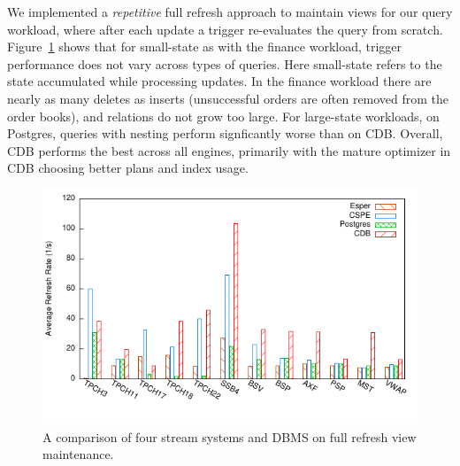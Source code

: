 We implemented a \textit{repetitive} full refresh approach to maintain views for
our query workload, where after each update a trigger re-evaluates the query
from scratch.
Figure~\ref{fig:enginecomp} shows that for small-state as with the finance
workload, trigger performance does not vary across types of queries. Here
small-state refers to the state accumulated while processing updates. In the
finance workload there are nearly as many deletes as inserts (unsuccessful
orders are often removed from the order books), and relations do not grow too
large. For large-state workloads, on Postgres, queries with nesting perform
signficantly worse than on CDB. Overall, CDB performs the best across all
engines, primarily with the mature optimizer in CDB choosing better plans and
index usage.

\begin{figure}[t]
\vspace{-3mm}
\begin{center}
\includegraphics[scale=0.85]{../graphs/graphs/engine_bakeoff.pdf}
\end{center}
\vspace{-8mm}
\caption{A comparison of four stream systems and DBMS on full refresh view
maintenance.}
\label{fig:enginecomp}
\vspace{-4mm}
\end{figure}


